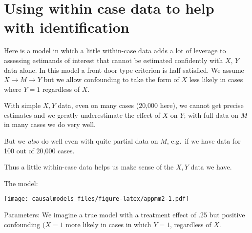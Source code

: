 \documentclass[
  12pt,
]{book}
\newenvironment{Shaded}{\begin{snugshade}}{\end{snugshade}}
\newcommand{\DataTypeTok}[1]{\textcolor[rgb]{0.13,0.29,0.53}{#1}}
\newcommand{\KeywordTok}[1]{\textcolor[rgb]{0.13,0.29,0.53}{\textbf{#1}}}
\newcommand{\NormalTok}[1]{#1}
\newcommand{\OperatorTok}[1]{\textcolor[rgb]{0.81,0.36,0.00}{\textbf{#1}}}
\newcommand{\StringTok}[1]{\textcolor[rgb]{0.31,0.60,0.02}{#1}}
\begin{document}
\hypertarget{using-within-case-data-to-help-with-identification}{%
\section{Using within case data to help with identification}\label{using-within-case-data-to-help-with-identification}}

Here is a model in which a little within-case data adds a lot of leverage to assessing estimands of interest that cannot be estimated confidently with \(X\), \(Y\) data alone. In this model a front door type criterion is half satisfied. We assume \(X\rightarrow M \rightarrow Y\) but we allow confounding to take the form of \(X\) less likely in cases where \(Y=1\) regardless of \(X\).

With simple \(X,Y\) data, even on many cases (20,000 here), we cannot get precise estimates and we greatly underestimate the effect of \(X\) on \(Y\); with full data on \(M\) in many cases we do very well.

But we \emph{also} do well even with quite partial data on \(M\), e.g.~if we have data for 100 out of 20,000 cases.

Thus a little within-case data helps us make sense of the \(X,Y\) data we have.

The model:

\begin{Shaded}
\end{Shaded}

\texttt{[image: causalmodels\_files/figure-latex/appmm2-1.pdf]}

Parameters: We imagine a true model with a treatment effect of .25 but positive confounding (\(X=1\) more likely in cases in which \(Y=1\), regardless of \(X\).
\end{document}
